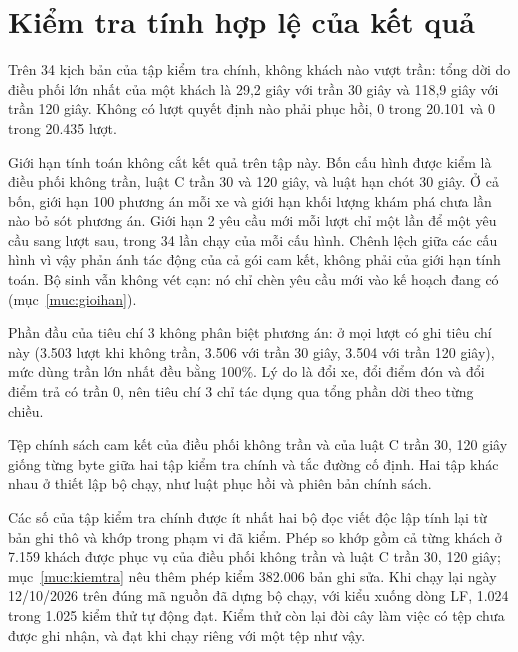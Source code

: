 \section{Kiểm tra tính hợp lệ của kết quả}
\label{muc:c4-hople}

Trên 34 kịch bản của tập kiểm tra chính, không khách nào vượt trần: tổng dời do điều phối lớn nhất của một khách là
29,2 giây với trần 30 giây và 118,9 giây với trần 120 giây. Không có lượt quyết định nào phải phục hồi, 0 trong 20.101
và 0 trong 20.435 lượt.

Giới hạn tính toán không cắt kết quả trên tập này. Bốn cấu hình được kiểm là điều phối không trần, luật C trần 30 và
120 giây, và luật hạn chót 30 giây. Ở cả bốn, giới hạn 100 phương án mỗi xe và giới hạn khối lượng khám phá chưa lần
nào bỏ sót phương án. Giới hạn 2 yêu cầu mới mỗi lượt chỉ một lần để một yêu cầu sang lượt sau, trong 34 lần chạy của
mỗi cấu hình. Chênh lệch giữa các cấu hình vì vậy phản ánh tác động của cả gói cam kết, không phải của giới hạn tính
toán. Bộ sinh vẫn không vét cạn: nó chỉ chèn yêu cầu mới vào kế hoạch đang có (mục~\ref{muc:gioihan}).

Phần đầu của tiêu chí 3 không phân biệt phương án: ở mọi lượt có ghi tiêu chí này (3.503 lượt khi không trần, 3.506
với trần 30 giây, 3.504 với trần 120 giây), mức dùng trần lớn nhất đều bằng 100\%. Lý do là đổi xe, đổi điểm đón và
đổi điểm trả có trần 0, nên tiêu chí 3 chỉ tác dụng qua tổng phần dời theo từng chiều.

Tệp chính sách cam kết của điều phối không trần và của luật C trần 30, 120 giây giống từng byte giữa hai tập kiểm tra
chính và tắc đường cố định. Hai tập khác nhau ở thiết lập bộ chạy, như luật phục hồi và phiên bản chính sách.

Các số của tập kiểm tra chính được ít nhất hai bộ đọc viết độc lập tính lại từ bản ghi thô và khớp trong phạm vi đã
kiểm. Phép so khớp gồm cả từng khách ở 7.159 khách được phục vụ của điều phối không trần và luật C trần 30, 120 giây;
mục~\ref{muc:kiemtra} nêu thêm phép kiểm 382.006 bản ghi sửa. Khi chạy lại ngày 12/10/2026 trên đúng mã nguồn đã dựng
bộ chạy, với kiểu xuống dòng LF, 1.024 trong 1.025 kiểm thử tự động đạt. Kiểm thử còn lại đòi cây làm việc có tệp chưa
được ghi nhận, và đạt khi chạy riêng với một tệp như vậy.


